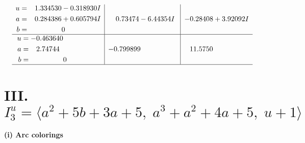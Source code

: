 \documentclass[1p]{elsarticle_modified}
\theoremstyle{definition}
\begin{document}
$$\begin{array}{c|c|c}
\begin{aligned}
u &= \phantom{-}1.334530 - 0.318930 I \\
a &= \phantom{-}0.284386 + 0.605794 I \\
b &= \phantom{-0.000000 } 0\end{aligned}
 & \phantom{-}0.73474 - 6.44354 I & -0.28408 + 3.92092 I \\ \hline\begin{aligned}
u &= -0.463640\phantom{ +0.000000I} \\
a &= \phantom{-}2.74744\phantom{ +0.000000I} \\
b &= \phantom{-0.000000 } 0\end{aligned}
 & -0.799899\phantom{ +0.000000I} & \phantom{-}11.5750\phantom{ +0.000000I}\\
 \hline 
 \end{array}$$\newpage\newpage\renewcommand{\arraystretch}{1}
\centering \section*{III. $I^u_{3}= \langle a^2+5 b+3 a+5,\;a^3+a^2+4 a+5,\;u+1 \rangle$}
\flushleft \textbf{(i) Arc colorings}\\
\end{document}
